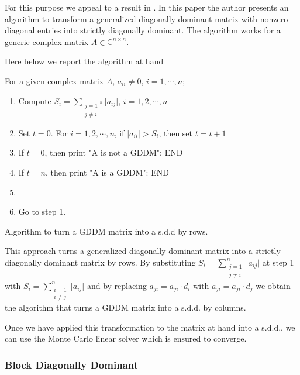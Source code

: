 For this purpose we
appeal to a result in \cite{Li2002}. In this paper the author presents an
algorithm to transform a generalized diagonally dominant matrix with
nonzero diagonal entries into strictly diagonally dominant. The
algorithm works for a generic complex matrix $A\in\mathbb{C}^{n\times n}$.

Here below we report the algorithm at hand\newline

\begin{algorithm}[H]
 For a given complex matrix $A$, $a_{ii}\ne 0$, $i=1,\cdots, n$;\newline
 \begin{enumerate}
  \item Compute $S_{i}=\sum_{\substack{j=1 \\ j\ne i}^{n}}\lvert
a_{ij}\rvert$,
$i=1,2,\cdots,n$
\item Set $t=0$. For $i=1,2,\cdots, n$, if $\lvert a_{ii}\rvert>S_i$, then set
$t=t+1$
\item If $t=0$, then print "A is not a GDDM": END
\item If $t=n$, then print "A is a GDDM": END
\item {}
\item Go to step 1.
 \end{enumerate}
 \caption{Algorithm to turn a GDDM matrix into a s.d.d by rows.}
\end{algorithm}

This approach turns a generalized diagonally dominant matrix into a
strictly diagonally dominant matrix by rows. By substituting
$\displaystyle S_{i}=\sum^{n}_{\substack{j=1 \\ j\ne i}}\lvert a_{ij}\rvert$
at step 1 with
$\displaystyle S_{i}=\sum^{n}_{\substack{i=1 \\ i\ne j}}\lvert a_{ij}\rvert$
and by replacing
$a_{ji}=a_{ji}\cdot d_i$ with $a_{ji}=a_{ji}\cdot d_j$ we obtain the algorithm
that turns a GDDM matrix into a s.d.d. by columns.\newline

Once we have applied this transformation to the matrix at hand into a s.d.d.,
we can use the Monte Carlo linear solver which is ensured to converge.

\subsubsection{Block Diagonally Dominant}

